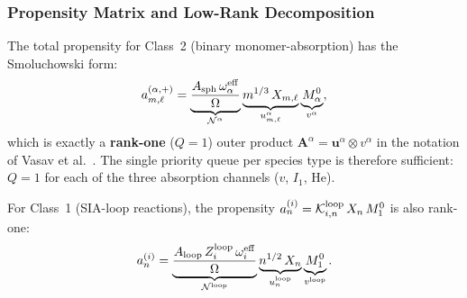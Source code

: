 \documentclass[pdflatex,sn-basic]{sn-jnl} %
\begin{document}
\subsubsection{Propensity Matrix and Low-Rank Decomposition}
\label{sec:hybrid_lowrank}

The total propensity for Class~2 (binary monomer-absorption) has
the Smoluchowski form:
\begin{equation}\label{eq:propmatrix}
    a_{m,\ell}^{(\alpha,+)}
    = \underbrace{
      \frac{A_{\rm sph}\,\omega_\alpha^{\rm eff}}{\Omega}
      }_{\mathcal{N}^\alpha}
      \underbrace{
        m^{1/3}\,X_{m,\ell}
        }_{u_{m,\ell}^\alpha}
      \underbrace{
        M_\alpha^0
        }_{v^\alpha},
\end{equation}
which is exactly a \textbf{rank-one} ($Q=1$) outer product
$\mathbf{A}^\alpha = \mathbf{u}^\alpha \otimes v^\alpha$
in the notation of Vasav et al.~\cite{Vasav2026}.  The single
priority queue per species type is therefore sufficient:
$Q = 1$ for each of the three absorption channels ($v$, $I_1$,
He).

For Class~1 (SIA-loop reactions), the propensity
$a_n^{(i)} = \mathcal{K}_{i,n}^{\rm loop}\,X_n\,M_1^0$ is also
rank-one:
\begin{equation}\label{eq:propmatrix_loop}
    a_n^{(i)}
    = \underbrace{
      \frac{A_{\rm loop}\,Z_i^{\rm loop}\,\omega_i^{\rm eff}}{\Omega}
      }_{\mathcal{N}^{\rm loop}}
      \underbrace{n^{1/2}\,X_n}_{u_n^{\rm loop}}
      \underbrace{M_1^0}_{v^{\rm loop}}.
\end{equation}
\end{document}
